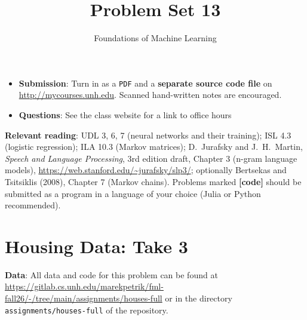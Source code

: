 \documentclass[letterpaper]{article}
\title{Problem Set 13}
\author{Foundations of Machine Learning}
\date{}
\begin{document}
\maketitle

\begin{itemize}
\item \textbf{Submission}: Turn in as a \texttt{PDF} and a \textbf{separate source code file} on \url{http://mycourses.unh.edu}. Scanned hand-written notes are encouraged.
\item \textbf{Questions}: See the class website for a link to office hours
\end{itemize}


\textbf{Relevant reading}: UDL 3, 6, 7 (neural networks and their training); ISL 4.3 (logistic regression); ILA 10.3 (Markov matrices); D.~Jurafsky and J.~H.~Martin, \emph{Speech and Language Processing}, 3rd edition draft, Chapter 3 (n-gram language models), \url{https://web.stanford.edu/~jurafsky/slp3/}; optionally Bertsekas and Tsitsiklis (2008), Chapter 7 (Markov chains). Problems marked \textbf{[code]} should be submitted as a program in a language of your choice (Julia or Python recommended).

\section{Housing Data: Take 3}

\textbf{Data}: All data and code for this problem can be found at \url{https://gitlab.cs.unh.edu/marekpetrik/fml-fall26/-/tree/main/assignments/houses-full} or in the directory \texttt{assignments/houses-full} of the repository.
\end{document}
